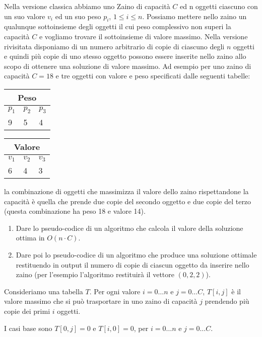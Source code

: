 \begin{esercizio}
Nella versione classica abbiamo uno Zaino di capacit\`a $C$ ed n oggetti ciascuno con un suo valore $v_i$ ed un suo peso $p_i$, $1 \le i \le n$. Possiamo mettere nello zaino un qualunque sottoinsieme degli oggetti il cui peso complessivo non superi la capacit\`a $C$ e vogliamo trovare il sottoinsieme di valore massimo. Nella versione rivisitata disponiamo di un numero arbitrario di copie di ciascuno degli $n$ oggetti e quindi pi\`u copie di uno stesso oggetto possono essere inserite nello zaino allo scopo di ottenere una soluzione di valore massimo. Ad esempio per uno zaino di capacit\`a $C = 18$ e tre oggetti con valore e peso specificati dalle seguenti tabelle:
\begin{center}
\begin{tabular}{lll}
\multicolumn{3}{c}{Peso} \\
\hline
$p_1$ & $p_2$ & $p_3$ \\
9 & 5 & 4
\end{tabular}
\qquad
\begin{tabular}{lll}
\multicolumn{3}{c}{Valore} \\
\hline
$v_1$ & $v_2$ & $v_3$ \\
6 & 4 & 3
\end{tabular}
\end{center}
la combinazione di oggetti che massimizza il valore dello zaino rispettandone la capacit\`a \`e quella che prende due copie del secondo oggetto e due copie del terzo (questa combinazione ha peso 18 e valore 14).
\begin{enumerate}
    \item Dare lo pseudo-codice di un algoritmo che calcola il valore della soluzione ottima in $O(n \cdot C)$.
    \item Dare poi lo pseudo-codice di un algoritmo che produce una soluzione ottimale restituendo in output il numero di copie di ciascun oggetto da inserire nello zaino (per l'esempio l'algoritmo restituir\`a il vettore $(0,2,2)$).
\end{enumerate}
\end{esercizio}

Consideriamo una tabella $T$. Per ogni valore $i = 0 \ldots n$ e $j = 0 \ldots C$, $T[i,j]$ \`e il valore massimo che si pu\`o trasportare in uno zaino di capacit\`a $j$ prendendo pi\`u copie dei primi $i$ oggetti.

I casi base sono $T[0,j] = 0$ e $T[i,0] = 0$, per $i = 0 \ldots n$ e $j = 0 \ldots C$.

